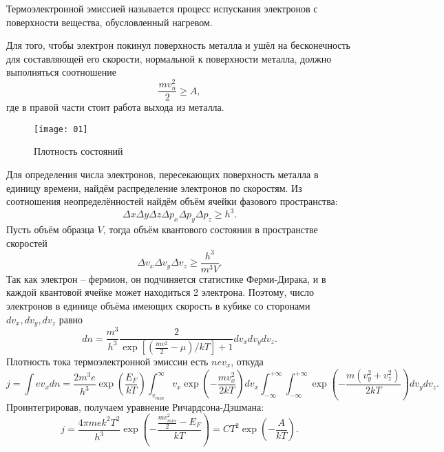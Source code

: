Термоэлектронной эмиссией называется процесс испускания электронов с поверхности
вещества, обусловленный нагревом.

Для того, чтобы электрон покинул поверхность металла и ушёл на бесконечность для
составляющей его скорости, нормальной к поверхности металла, должно выполняться
соотношение
\[
    \frac{mv_n^2}{2} \ge A,
\]
где в правой части стоит работа выхода из металла.
\begin{figure}[h]
\begin{center}
    \texttt{[image: 01]}
\end{center}
\caption{Плотность состояний}
\end{figure}

Для определения числа электронов, пересекающих поверхность металла в единицу
времени, найдём распределение электронов по скоростям.
Из соотношения неопределённостей найдём объём ячейки фазового пространства:
\[
    \Delta x \Delta y \Delta z \Delta p_x \Delta p_y \Delta p_z \ge h^3.
\]
Пусть объём образца \( V \), тогда объём квантового состояния в пространстве
скоростей
\[
     \Delta v_x \Delta v_y \Delta v_z \ge \frac{h^3}{m^3V}.
\]
Так как электрон -- фермион, он подчиняется статистике Ферми-Дирака, и в каждой
квантовой ячейке может находиться 2 электрона. Поэтому, число электронов в
единице объёма имеющих скорость в кубике со сторонами \( dv_x, dv_y, dv_z \)
равно
\[
    dn = \frac{m^3}{h^3}\frac{2}{\exp\left[\left(\frac{mv^2}{2} -
    \mu\right)/kT\right]+1} dv_xdv_ydv_z.
\]
Плотность тока термоэлектронной эмиссии есть \( nev_x \), откуда
\[
    j = \int ev_x dn = \frac{2m^3e}{h^3}\exp\left(\frac{E_F}{kT} \right)
    \int_{v_{min}}^\infty v_x\exp\left(-\frac{mv_x^2}{2kT}\right)dv_x
    \int_{-\infty}^{+\infty}\int_{-\infty}^{+\infty}
    \exp\left(-\frac{m(v_y^2+v_z^2)}{2kT}\right)dv_ydv_z.
\]
Проинтегрировав, получаем уравнение Ричардсона-Дэшмана:
\[
    j = \frac{4\pi me k^2T^2}{h^3}
    \exp\left(-\frac{\frac{mv_{min}^2}{2} - E_F}{kT}\right) =
    CT^2\exp\left(-\frac{A}{kT} \right).
\]

